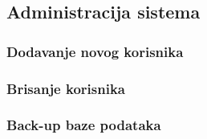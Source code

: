 \subsection{Administracija sistema}

\subsubsection{Dodavanje novog korisnika}

\subsubsection{Brisanje korisnika}
\label{su: brisanje korisnika}

\subsubsection{Back-up baze podataka}